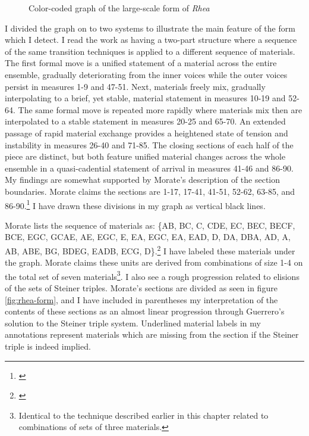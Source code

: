 \begin{figure}[p]
\centering
    \caption{Color-coded graph of the large-scale form of \textit{Rhea}}
    \label{fig:Rhea-graph}
\end{figure}

I divided the graph on to two systems to illustrate the main feature of the form which I detect. I read the work as having a two-part structure where a sequence of the same transition techniques is applied to a different sequence of materials. The first formal move is a unified statement of a material across the entire ensemble, gradually deteriorating from the inner voices while the outer voices persist in measures 1-9 and 47-51. Next, materials freely mix, gradually interpolating to a brief, yet stable, material statement in measures 10-19 and 52-64. The same formal move is repeated more rapidly where materials mix then are interpolated to a stable statement in measures 20-25 and 65-70. An extended passage of rapid material exchange provides a heightened state of tension and instability in measures 26-40 and 71-85. The closing sections of each half of the piece are distinct, but both feature unified material changes across the whole ensemble in a quasi-cadential statement of arrival in measures 41-46 and 86-90. My findings are somewhat supported by Morate's description of the section boundaries. Morate claims the sections are 1-17, 17-41, 41-51, 52-62, 63-85, and 86-90.\footnote{\citet[285-286]{guerreropaper}} I have drawn these divisions in my graph as vertical black lines.

Morate lists the sequence of materials as: \{AB, BC, C, CDE, EC, BEC, BECF, BCE, EGC, GCAE, AE, EGC, E, EA, EGC, EA, EAD, D, DA, DBA, AD, A, AB, ABE, BG, BDEG, EADB, ECG, D\}.\footnote{\citet[285-286]{guerreropaper}} I have labeled these materials under the graph. Morate claims these units are derived from combinations of size 1-4 on the total set of seven materials\footnote{Identical to the technique described earlier in this chapter related to combinations of sets of three materials.}. I also see a rough progression related to elisions of the sets of Steiner triples. Morate's sections are divided as seen in figure \ref{fig:rhea-form}, and I have included in parentheses my interpretation of the contents of these sections as an almost linear progression through Guerrero's solution to the Steiner triple system. Underlined material labels in my annotations represent materials which are missing from the section if the Steiner triple is indeed implied.

